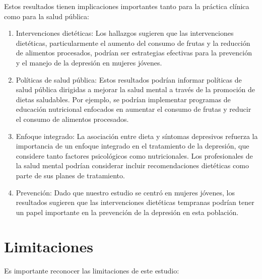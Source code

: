 \documentclass[man]{apa7}
\begin{document}
	Estos resultados tienen implicaciones importantes tanto para la práctica
	clínica como para la salud pública:

	\begin{enumerate}
		\item Intervenciones dietéticas: Los hallazgos sugieren que las intervenciones dietéticas, particularmente el aumento del consumo de frutas y la reducción de alimentos procesados, podrían ser estrategias efectivas para la prevención y el manejo de la depresión en mujeres jóvenes.
		\item Políticas de salud pública: Estos resultados podrían informar políticas de salud pública dirigidas a mejorar la salud mental a través de la promoción de dietas saludables. Por ejemplo, se podrían implementar programas de educación nutricional enfocados en aumentar el consumo de frutas y reducir el consumo de alimentos procesados.
		\item Enfoque integrado: La asociación entre dieta y síntomas depresivos refuerza la importancia de un enfoque integrado en el tratamiento de la depresión, que considere tanto factores psicológicos como nutricionales. Los profesionales de la salud mental podrían considerar incluir recomendaciones dietéticas como parte de sus planes de tratamiento.
		\item Prevención: Dado que nuestro estudio se centró en mujeres jóvenes, los resultados sugieren que las intervenciones dietéticas tempranas podrían tener un papel importante en la prevención de la depresión en esta población.
	\end{enumerate}


	\section{Limitaciones}\label{limitaciones}

	Es importante reconocer las limitaciones de este estudio:
\end{document}
